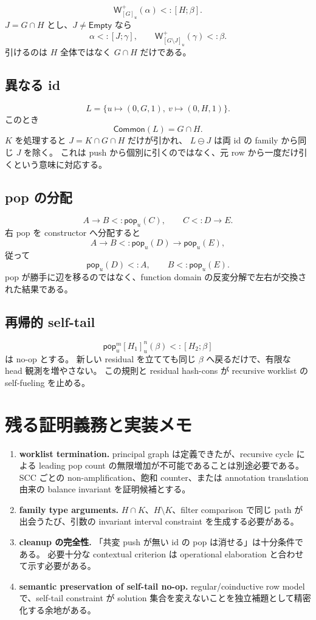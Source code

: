 \documentclass[uplatex,dvipdfmx,a4paper,10.5pt]{jsarticle}
\theoremstyle{jpplain}
\newcommand{\Empty}{\mathsf{Empty}}
\newcommand{\Common}{\mathsf{Common}}
\newcommand{\PWeight}[2]{\mathsf{W}^{+}_{#1}(#2)}
\newcommand{\takeop}[2]{[#1]_{#2}}
\newcommand{\popop}[1]{\mathsf{pop}_{#1}}
\newcommand{\row}[2]{[#1;#2]}
\begin{document}
\[
  \PWeight{\takeop{G}{u}}{\alpha}<:\row{H}{\beta}.
\]
$J=G\cap H$ とし、$J\neq\Empty$ なら
\[
  \alpha<:\row{J}{\gamma},
  \qquad
  \PWeight{\takeop{G\setminus J}{u}}{\gamma}<:\beta.
\]
引けるのは $H$ 全体ではなく $G\cap H$ だけである。

\subsection{異なる id}

\[
  L=\{u\mapsto(0,G,1),\ v\mapsto(0,H,1)\}.
\]
このとき
\[
  \Common(L)=G\cap H.
\]
$K$ を処理すると $J=K\cap G\cap H$ だけが引かれ、
$L\ominus J$ は両 id の family から同じ $J$ を除く。
これは push から個別に引くのではなく、元 row から一度だけ引くという意味に対応する。

\subsection{pop の分配}

\[
  A\to B <: \popop{u}(C),
  \qquad C<:D\to E.
\]
右 pop を constructor へ分配すると
\[
  A\to B <: \popop{u}(D)\to\popop{u}(E),
\]
従って
\[
  \popop{u}(D)<:A,
  \qquad B<:\popop{u}(E).
\]
pop が勝手に辺を移るのではなく、function domain の反変分解で左右が交換された結果である。

\subsection{再帰的 self-tail}

\[
  \popop{u}^{m}\takeop{H_1}{u}^{n}(\beta)<:\row{H_2}{\beta}
\]
は no-op とする。
新しい residual を立てても同じ $\beta$ へ戻るだけで、有限な head 観測を増やさない。
この規則と residual hash-cons が recursive worklist の self-fueling を止める。

\section{残る証明義務と実装メモ}

\begin{enumerate}
  \item \textbf{worklist termination.}
  principal graph は定義できたが、recursive cycle による leading pop count の無限増加が不可能であることは別途必要である。
  SCC ごとの non-amplification、飽和 counter、または annotation translation 由来の balance invariant を証明候補とする。
  \item \textbf{family type arguments.}
  $H\cap K$、$H\setminus K$、filter comparison で同じ path が出会うたび、引数の invariant interval constraint を生成する必要がある。
  \item \textbf{cleanup の完全性.}
  「共変 push が無い id の pop は消せる」は十分条件である。
  必要十分な contextual criterion は operational elaboration と合わせて示す必要がある。
  \item \textbf{semantic preservation of self-tail no-op.}
  regular/coinductive row model で、self-tail constraint が solution 集合を変えないことを独立補題として精密化する余地がある。
\end{enumerate}
\end{document}
